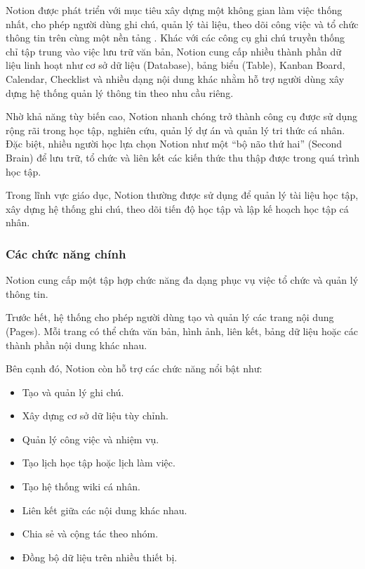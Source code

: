 Notion được phát triển với mục tiêu xây dựng một không gian làm việc thống nhất, cho phép người dùng ghi chú, quản lý tài liệu, theo dõi công việc và tổ chức thông tin trên cùng một nền tảng \cite{notionProduct}. Khác với các công cụ ghi chú truyền thống chỉ tập trung vào việc lưu trữ văn bản, Notion cung cấp nhiều thành phần dữ liệu linh hoạt như cơ sở dữ liệu (Database), bảng biểu (Table), Kanban Board, Calendar, Checklist và nhiều dạng nội dung khác nhằm hỗ trợ người dùng xây dựng hệ thống quản lý thông tin theo nhu cầu riêng.

Nhờ khả năng tùy biến cao, Notion nhanh chóng trở thành công cụ được sử dụng rộng rãi trong học tập, nghiên cứu, quản lý dự án và quản lý tri thức cá nhân. Đặc biệt, nhiều người học lựa chọn Notion như một “bộ não thứ hai” (Second Brain) để lưu trữ, tổ chức và liên kết các kiến thức thu thập được trong quá trình học tập.

Trong lĩnh vực giáo dục, Notion thường được sử dụng để quản lý tài liệu học tập, xây dựng hệ thống ghi chú, theo dõi tiến độ học tập và lập kế hoạch học tập cá nhân.

\subsubsection{Các chức năng chính}

Notion cung cấp một tập hợp chức năng đa dạng phục vụ việc tổ chức và quản lý thông tin.

Trước hết, hệ thống cho phép người dùng tạo và quản lý các trang nội dung (Pages). Mỗi trang có thể chứa văn bản, hình ảnh, liên kết, bảng dữ liệu hoặc các thành phần nội dung khác nhau.

Bên cạnh đó, Notion còn hỗ trợ các chức năng nổi bật như:
\begin{itemize}
    \item Tạo và quản lý ghi chú.
    \item Xây dựng cơ sở dữ liệu tùy chỉnh.
    \item Quản lý công việc và nhiệm vụ.
    \item Tạo lịch học tập hoặc lịch làm việc.
    \item Tạo hệ thống wiki cá nhân.
    \item Liên kết giữa các nội dung khác nhau.
    \item Chia sẻ và cộng tác theo nhóm.
    \item Đồng bộ dữ liệu trên nhiều thiết bị.
\end{itemize}

